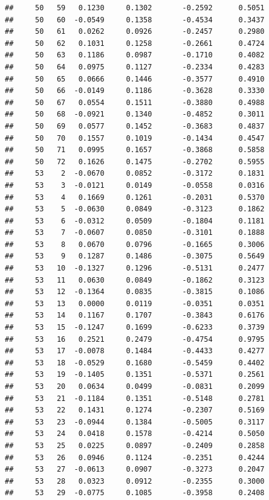 \documentclass[
]{article}
\begin{document}
\begin{verbatim}
##     50   59   0.1230     0.1302       -0.2592      0.5051  
##     50   60  -0.0549     0.1358       -0.4534      0.3437  
##     50   61   0.0262     0.0926       -0.2457      0.2980  
##     50   62   0.1031     0.1258       -0.2661      0.4724  
##     50   63   0.1186     0.0987       -0.1710      0.4082  
##     50   64   0.0975     0.1127       -0.2334      0.4283  
##     50   65   0.0666     0.1446       -0.3577      0.4910  
##     50   66  -0.0149     0.1186       -0.3628      0.3330  
##     50   67   0.0554     0.1511       -0.3880      0.4988  
##     50   68  -0.0921     0.1340       -0.4852      0.3011  
##     50   69   0.0577     0.1452       -0.3683      0.4837  
##     50   70   0.1557     0.1019       -0.1434      0.4547  
##     50   71   0.0995     0.1657       -0.3868      0.5858  
##     50   72   0.1626     0.1475       -0.2702      0.5955  
##     53    2  -0.0670     0.0852       -0.3172      0.1831  
##     53    3  -0.0121     0.0149       -0.0558      0.0316  
##     53    4   0.1669     0.1261       -0.2031      0.5370  
##     53    5  -0.0630     0.0849       -0.3123      0.1862  
##     53    6  -0.0312     0.0509       -0.1804      0.1181  
##     53    7  -0.0607     0.0850       -0.3101      0.1888  
##     53    8   0.0670     0.0796       -0.1665      0.3006  
##     53    9   0.1287     0.1486       -0.3075      0.5649  
##     53   10  -0.1327     0.1296       -0.5131      0.2477  
##     53   11   0.0630     0.0849       -0.1862      0.3123  
##     53   12  -0.1364     0.0835       -0.3815      0.1086  
##     53   13   0.0000     0.0119       -0.0351      0.0351  
##     53   14   0.1167     0.1707       -0.3843      0.6176  
##     53   15  -0.1247     0.1699       -0.6233      0.3739  
##     53   16   0.2521     0.2479       -0.4754      0.9795  
##     53   17  -0.0078     0.1484       -0.4433      0.4277  
##     53   18  -0.0529     0.1680       -0.5459      0.4402  
##     53   19  -0.1405     0.1351       -0.5371      0.2561  
##     53   20   0.0634     0.0499       -0.0831      0.2099  
##     53   21  -0.1184     0.1351       -0.5148      0.2781  
##     53   22   0.1431     0.1274       -0.2307      0.5169  
##     53   23  -0.0944     0.1384       -0.5005      0.3117  
##     53   24   0.0418     0.1578       -0.4214      0.5050  
##     53   25   0.0225     0.0897       -0.2409      0.2858  
##     53   26   0.0946     0.1124       -0.2351      0.4244  
##     53   27  -0.0613     0.0907       -0.3273      0.2047  
##     53   28   0.0323     0.0912       -0.2355      0.3000  
##     53   29  -0.0775     0.1085       -0.3958      0.2408  

\end{verbatim}
\end{document}
